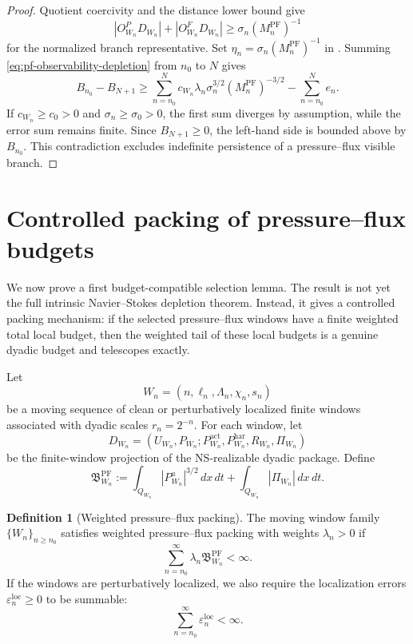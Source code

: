 \documentclass[11pt]{article}
\numberwithin{equation}{section}
\theoremstyle{plain}
\theoremstyle{definition}
\newtheorem{definition}[theorem]{Definition}
\theoremstyle{remark}
\newcommand{\PF}{\mathrm{PF}}
\newcommand{\loc}{\mathrm{loc}}
\newcommand{\har}{\mathrm{har}}
\newcommand{\bfB}{\mathfrak B}
\newcommand{\act}{\mathrm{act}}
\begin{document}
\begin{proof}
Quotient coercivity and the distance lower bound give
\[
        |O^P_{W_n}D_{W_n}|+|O^F_{W_n}D_{W_n}|
        \ge
        \sigma_n(M^{\PF}_n)^{-1}
\]
for the normalized branch representative.  Set \(\eta_n=\sigma_n(M^{\PF}_n)^{-1}\) in .  Summing \eqref{eq:pf-observability-depletion} from \(n_0\) to \(N\) gives
\[
        B_{n_0}-B_{N+1}
        \ge
        \sum_{n=n_0}^{N}c_{W_n}\lambda_n\sigma_n^{3/2}(M^{\PF}_n)^{-3/2}
        -
        \sum_{n=n_0}^{N}e_n.
\]
If \(c_{W_n}\ge c_0>0\) and \(\sigma_n\ge\sigma_0>0\), the first sum diverges by assumption, while the error sum remains finite.  Since \(B_{N+1}\ge0\), the left-hand side is bounded above by \(B_{n_0}\).  This contradiction excludes indefinite persistence of a pressure--flux visible branch.
\end{proof}
\section{Controlled packing of pressure--flux budgets}
\label{sec:controlled-packing-pf-budget}

We now prove a first budget-compatible selection lemma.  The result is not yet the full intrinsic Navier--Stokes depletion theorem.  Instead, it gives a controlled packing mechanism: if the selected pressure--flux windows have a finite weighted total local budget, then the weighted tail of these local budgets is a genuine dyadic budget and telescopes exactly.

Let
\[
        W_n=(n,\ell_n,\Lambda_n,\chi_n,s_n)
\]
be a moving sequence of clean or perturbatively localized finite windows associated with dyadic scales \(r_n=2^{-n}\).  For each window, let
\[
        D_{W_n}=(U_{W_n},P_{W_n};P^{\act}_{W_n},P^{\har}_{W_n},R_{W_n},\Pi_{W_n})
\]
be the finite-window projection of the NS-realizable dyadic package.  Define
\begin{equation}
        \bfB^{\PF}_{W_n}
        :=
        \int_{Q_{W_n}}|P^a_{W_n}|^{3/2}\,dx\,dt
        +
        \int_{Q_{W_n}}|\Pi_{W_n}|\,dx\,dt.
        \label{eq:packing-local-budget}
\end{equation}

\begin{definition}[Weighted pressure--flux packing]
\label{def:weighted-pf-packing}
The moving window family \(\{W_n\}_{n\ge n_0}\) satisfies weighted pressure--flux packing with weights \(\lambda_n>0\) if
\begin{equation}
        \sum_{n=n_0}^{\infty}
        \lambda_n\bfB^{\PF}_{W_n}
        <
        \infty.
        \label{eq:weighted-pf-packing}
\end{equation}
If the windows are perturbatively localized, we also require the localization errors \(\varepsilon_n^{\loc}\ge0\) to be summable:
\[
        \sum_{n=n_0}^{\infty}\varepsilon_n^{\loc}<\infty.
\]
\end{definition}
\end{document}
